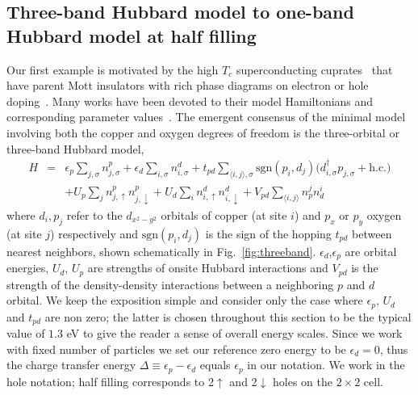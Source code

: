 \subsection{Three-band Hubbard model to one-band Hubbard model at half filling}
\label{subsection:3band} 
Our first example is motivated by the high $T_c$ superconducting cuprates~\cite{Bednorz1986} that 
have parent Mott insulators with rich phase diagrams on electron or hole doping~\cite{Dagotto_RevModPhys, LeeWen_RevModPhys}. 
Many works have been devoted to their model Hamiltonians and corresponding parameter 
values~\cite{tJSpalek, Emery, ZhangRice, Hybertsen_PRB1989, Hybertsen_PRB1990, Pavirini, Kent_Hubbard}. 
The emergent consensus of the minimal model involving both the copper and oxygen degrees of freedom 
is the three-orbital or three-band Hubbard model, 
\begin{eqnarray}
H &=&    \epsilon_p \sum_{j,\sigma} n^{p}_{j,\sigma} + \epsilon_{d} \sum_{i,\sigma}  n^{d}_{i,\sigma} 
	+ t_{pd} \sum_{\langle i,j \rangle, \sigma} \text{sgn}(p_i,d_j) \Big( d_{i,\sigma}^{\dagger} p_{j,\sigma} + \text{h.c.} \Big) \nonumber \\
  & &   + U_p \sum_{j} n^{p}_{j,\uparrow} n^{p}_{j,\downarrow} + U_d \sum_{i} n^{d}_{i,\uparrow} n^{d}_{i,\downarrow} + V_{pd} \sum_{\langle i,j \rangle} n^{j}_p n^{i}_d 
\end{eqnarray}
where $d_i,p_j$ refer to the  $d_{x^2 - y^2}$ orbitals of copper (at site $i$) and $p_x$ or $p_y$ 
oxygen (at site $j$)  respectively and $\text{sgn}(p_i,d_j)$ is the sign of the hopping $t_{pd}$ 
between nearest neighbors, shown schematically in Fig.~\ref{fig:threeband}. 
$\epsilon_d$,$\epsilon_p$ are orbital energies, $U_d$, $U_p$ are strengths of onsite Hubbard interactions 
and $V_{pd}$ is the strength of the density-density interactions between a neighboring $p$ and $d$ orbital. 
We keep the exposition simple and consider only the case where $\epsilon_p$, $U_d$ and $t_{pd}$ 
are non zero; the latter is chosen throughout this section to be the typical value of $1.3$ eV to give the reader a sense of overall energy 
scales. Since we work with fixed number of particles we set our reference zero energy 
to be $\epsilon_d = 0$, thus the charge transfer energy $\Delta \equiv \epsilon_p - \epsilon_d$ equals $\epsilon_p$ in our notation. 
We work in the hole notation; half filling corresponds to 2$\uparrow$ and 2$\downarrow$ holes on the $2\times2$ cell.

